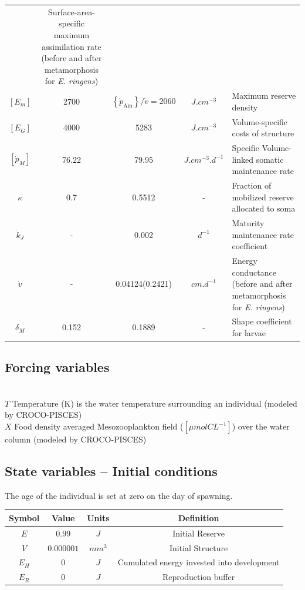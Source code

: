 \begin{table}[H]
\begin{adjustbox}{width=1.2\textwidth}
\begin{tabular}{c|c|c|c|l}
	& \makecell[l]{Surface-area-specific maximum assimilation rate \\ (before and after metamorphosis for \textit{E. ringens})} \\
$\left[ E_{m} \right]$ 
	& 2700
	& $\left \{ \dot{p}_\mathrm{Am} \right \}/\dot{v}=2060$
	& $J.cm^{-3}$ & Maximum reserve density\\
$\left[ E_{G} \right]$
	& 4000
	& 5283
	& $J.cm^{-3}$ & Volume-specific costs of structure\\
$\left [ \dot{p}_{M} \right ]$
	& 76.22
	& 79.95
	& $J.cm^{-3}.d^{-1}$
	& Specific Volume-linked somatic maintenance rate\\
$\kappa$
	& 0.7 
	& 0.5512 
	& - 
	& Fraction of mobilized reserve allocated to soma\\
$\dot{k}_{J}$ & - & 0.002 	        & $d^{-1}$     & Maturity maintenance rate coefficient\\
$\dot{v}$
	& - & 0.04124(0.2421)
	& $cm. d^{-1}$ 
	& \makecell[l]{Energy conductance \\ (before and after metamorphosis for \textit{E. ringens})}\\
$\delta_{M}$
	& 0.152
	& 0.1889
	& -
	& Shape coefficient for larvae\\
\end{tabular}
\end{adjustbox}
\end{table}


\subsection*{Forcing variables}
\hfill \\

$T$ Temperature (K) is the water temperature surrounding an individual (modeled by CROCO-PISCES)\\

$X$ Food density averaged Mesozooplankton field ($\left[ \mu mol CL^{-1} \right]$) over the water column (modeled by CROCO-PISCES)\\

\subsection*{State variables – Initial conditions}

The age of the individual is set at zero on the day of spawning.\\

\begin{tabular}{|c|c|c|c|}
\hline 
Symbol  & Value      & Units  & Definition      \\ 
\hline 
$E$     & $0.99$     & $J$    & Initial Reserve \\ 
$V$     & $0.000001$ & $mm^3$ & Initial Structure\\
$E_{H}$ & $0$ 		  & $J$    & Cumulated energy invested into development\\
$E_{R}$ & $0$         & $J$   & Reproduction buffer\\
\hline 
\end{tabular}

